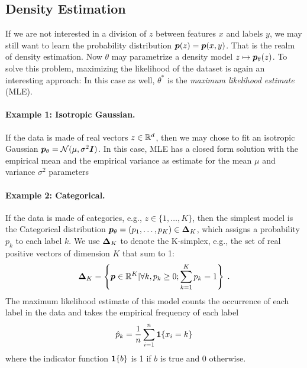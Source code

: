 \subsection{Density Estimation}
\label{ssec:density-estimation}
If we are not interested in a division of $z$ between features $x$ and labels $y$, we may still want to learn the probability distribution $\bm{p}(z) = \bm{p}(x, y)$. That is the realm of density estimation.
Now $\theta$ may parametrize a density model $z \mapsto \bm{p}_{\theta}(z)$.
To solve this problem, maximizing the likelihood of the dataset is again an interesting approach:
In this case as well, $\theta^*$ is the \emph{maximum likelihood estimate} (MLE).

\paragraph{Example 1: Isotropic Gaussian.}
If the data is made of real vectors $z\in\mathbb{R}^d$,
then we may chose to fit an isotropic Gaussian $\bm{p}_{\theta} = {\mathcal N}(\mu, \sigma^2 {\bm{I}})$.
In this case, MLE has a closed form solution with the empirical mean and the empirical variance as estimate for the mean $\mu$ and variance $\sigma^2$ parameters

\paragraph{Example 2: Categorical.}
If the data is made of categories, e.g.,  $z \in \{1, \dots, K\}$, then the simplest model is the Categorical distribution $\bm{p}_{\theta} = (p_1, \dots, p_K) \in \bm{\Delta}_K$, which assigns a probability $p_k$ to each label $k$. We use $\bm{\Delta}_K$ to denote the K-simplex, e.g., the set of real positive vectors of dimension $K$ that sum to 1:
\begin{align}
    \bm{\Delta}_K = \left\{ {\bm{p}} \in \mathbb{R}^K | \forall k, p_k \ge 0 ; \sum_{k=1}^K  p_k = 1 \right\} \; .
\end{align}
The maximum likelihood estimate of this model counts the occurrence of each label in the data and takes the empirical frequency of each label
\begin{align}
    \hat p_k  = \frac{1}{n} \sum_{i=1}^n \operatorname{\mathbf{1}}\{x_i = k\}
\end{align}
where the indicator function $\operatorname{\mathbf{1}}\{ b\}$ is 1 if $b$ is true and 0 otherwise.

